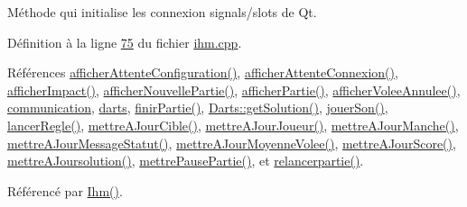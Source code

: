 Méthode qui initialise les connexion signals/slots de Qt. 



Définition à la ligne \hyperlink{ihm_8cpp_source_l00075}{75} du fichier \hyperlink{ihm_8cpp_source}{ihm.\+cpp}.



Références \hyperlink{ihm_8cpp_source_l00463}{afficher\+Attente\+Configuration()}, \hyperlink{ihm_8cpp_source_l00473}{afficher\+Attente\+Connexion()}, \hyperlink{ihm_8cpp_source_l00191}{afficher\+Impact()}, \hyperlink{ihm_8cpp_source_l00383}{afficher\+Nouvelle\+Partie()}, \hyperlink{ihm_8cpp_source_l00333}{afficher\+Partie()}, \hyperlink{ihm_8cpp_source_l00353}{afficher\+Volee\+Annulee()}, \hyperlink{ihm_8h_source_l00054}{communication}, \hyperlink{ihm_8h_source_l00055}{darts}, \hyperlink{ihm_8cpp_source_l00365}{finir\+Partie()}, \hyperlink{darts_8cpp_source_l00110}{Darts\+::get\+Solution()}, \hyperlink{ihm_8cpp_source_l00590}{jouer\+Son()}, \hyperlink{ihm_8cpp_source_l00623}{lancer\+Regle()}, \hyperlink{ihm_8cpp_source_l00565}{mettre\+A\+Jour\+Cible()}, \hyperlink{ihm_8cpp_source_l00242}{mettre\+A\+Jour\+Joueur()}, \hyperlink{ihm_8cpp_source_l00179}{mettre\+A\+Jour\+Manche()}, \hyperlink{ihm_8cpp_source_l00218}{mettre\+A\+Jour\+Message\+Statut()}, \hyperlink{ihm_8cpp_source_l00289}{mettre\+A\+Jour\+Moyenne\+Volee()}, \hyperlink{ihm_8cpp_source_l00141}{mettre\+A\+Jour\+Score()}, \hyperlink{ihm_8cpp_source_l00508}{mettre\+A\+Joursolution()}, \hyperlink{ihm_8cpp_source_l00519}{mettre\+Pause\+Partie()}, et \hyperlink{ihm_8cpp_source_l00539}{relancerpartie()}.



Référencé par \hyperlink{ihm_8cpp_source_l00026}{Ihm()}.


